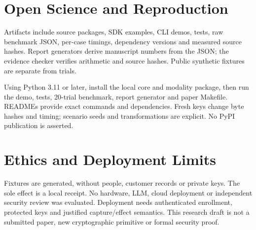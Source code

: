 \section{Open Science and Reproduction}
Artifacts include source packages, SDK examples, CLI demos, tests, raw benchmark
JSON, per-case timings, dependency versions and measured source hashes. Report
generators derive manuscript numbers from the JSON; the evidence checker verifies
arithmetic and source hashes. Public synthetic fixtures are separate from trials.

Using Python 3.11 or later, install the local core and modality package, then run
the demo, tests, 20-trial benchmark, report generator and paper Makefile. READMEs
provide exact commands and dependencies. Fresh keys change byte hashes and timing;
scenario seeds and transformations are explicit. No PyPI publication is asserted.

\section{Ethics and Deployment Limits}
Fixtures are generated, without people, customer records or private keys. The
sole effect is a local receipt. No hardware, LLM, cloud deployment or independent
security review was evaluated. Deployment needs authenticated enrollment,
protected keys and justified capture/effect semantics. This research draft is not
a submitted paper, new cryptographic primitive or formal security proof.
